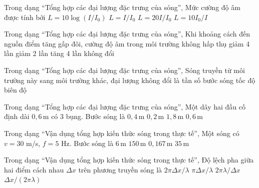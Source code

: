 \begin{ex}
Trong dạng “Tổng hợp các đại lượng đặc trưng của sóng”, Mức cường độ âm được tính bởi
\choice
{\True $L=10\log(I/I_0)$}
{$L=I/I_0$}
{$L=20I/I_0$}
{$L=10I_0/I$}
\end{ex}

\begin{ex}
Trong dạng “Tổng hợp các đại lượng đặc trưng của sóng”, Khi khoảng cách đến nguồn điểm tăng gấp đôi, cường độ âm trong môi trường không hấp thụ
\choice
{\True giảm 4 lần}
{giảm 2 lần}
{tăng 4 lần}
{không đổi}
\end{ex}

\begin{ex}
Trong dạng “Tổng hợp các đại lượng đặc trưng của sóng”, Sóng truyền từ môi trường này sang môi trường khác, đại lượng không đổi là
\choice
{\True tần số}
{bước sóng}
{tốc độ}
{biên độ}
\end{ex}

\begin{ex}
Trong dạng “Tổng hợp các đại lượng đặc trưng của sóng”, Một dây hai đầu cố định dài $0,6\,\text{m}$ có 3 bụng. Bước sóng là
\choice
{\True $0,4\,\text{m}$}
{$0,2\,\text{m}$}
{$1,8\,\text{m}$}
{$0,6\,\text{m}$}
\end{ex}

\begin{ex}
Trong dạng “Vận dụng tổng hợp kiến thức sóng trong thực tế”, Một sóng có $v=30$ m/s, $f=5$ Hz. Bước sóng là
\choice
{\True $6\,\text{m}$}
{$150\,\text{m}$}
{$0,167\,\text{m}$}
{$35\,\text{m}$}
\end{ex}

\begin{ex}
Trong dạng “Vận dụng tổng hợp kiến thức sóng trong thực tế”, Độ lệch pha giữa hai điểm cách nhau $\Delta x$ trên phương truyền sóng là
\choice
{\True $2\pi\Delta x/\lambda$}
{$\pi\Delta x/\lambda$}
{$2\pi\lambda/\Delta x$}
{$\Delta x/(2\pi\lambda)$}
\end{ex}

